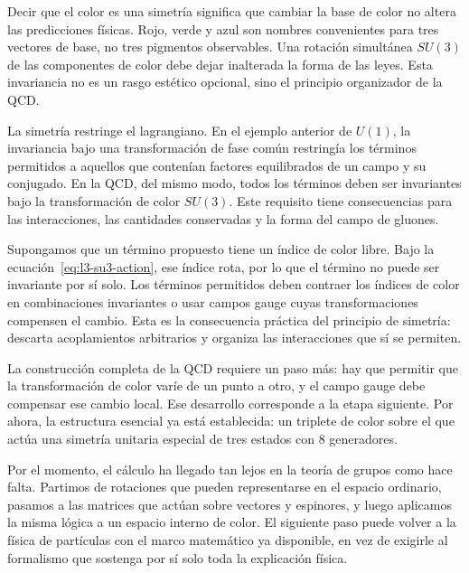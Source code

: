 Decir que el color es una simetría significa que cambiar la base de color no altera las predicciones físicas. Rojo, verde y azul son nombres convenientes para tres vectores de base, no tres pigmentos observables. Una rotación simultánea \(SU(3)\) de las componentes de color debe dejar inalterada la forma de las leyes. Esta invariancia no es un rasgo estético opcional, sino el principio organizador de la QCD.

La simetría restringe el lagrangiano. En el ejemplo anterior de \(U(1)\), la invariancia bajo una transformación de fase común restringía los términos permitidos a aquellos que contenían factores equilibrados de un campo y su conjugado. En la QCD, del mismo modo, todos los términos deben ser invariantes bajo la transformación de color \(SU(3)\). Este requisito tiene consecuencias para las interacciones, las cantidades conservadas y la forma del campo de gluones.

Supongamos que un término propuesto tiene un índice de color libre. Bajo la ecuación~\eqref{eq:l3-su3-action}, ese índice rota, por lo que el término no puede ser invariante por sí solo. Los términos permitidos deben contraer los índices de color en combinaciones invariantes o usar campos gauge cuyas transformaciones compensen el cambio. Esta es la consecuencia práctica del principio de simetría: descarta acoplamientos arbitrarios y organiza las interacciones que sí se permiten.

La construcción completa de la QCD requiere un paso más: hay que permitir que la transformación de color varíe de un punto a otro, y el campo gauge debe compensar ese cambio local. Ese desarrollo corresponde a la etapa siguiente. Por ahora, la estructura esencial ya está establecida: un triplete de color sobre el que actúa una simetría unitaria especial de tres estados con 8 generadores.

Por el momento, el cálculo ha llegado tan lejos en la teoría de grupos como hace falta. Partimos de rotaciones que pueden representarse en el espacio ordinario, pasamos a las matrices que actúan sobre vectores y espinores, y luego aplicamos la misma lógica a un espacio interno de color. El siguiente paso puede volver a la física de partículas con el marco matemático ya disponible, en vez de exigirle al formalismo que sostenga por sí solo toda la explicación física.